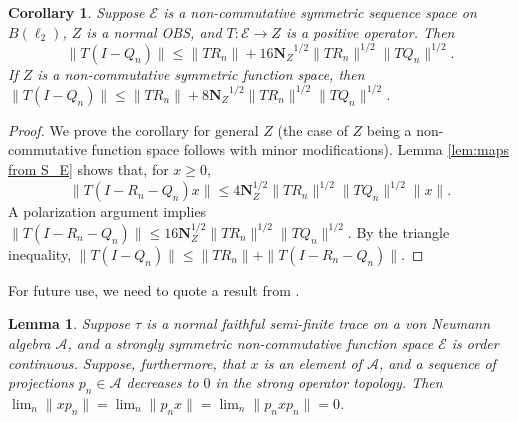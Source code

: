 \documentclass[12pt]{amsart}
\theoremstyle{plain}
\newtheorem{corollary}[theorem]{Corollary}
\newtheorem{lemma}[theorem]{Lemma}
\theoremstyle{definition}
\renewcommand{\leq}{\leqslant}
\renewcommand{\geq}{\geqslant}\usepackage{amssymb}
\newcommand{\ce}{\mathcal E}
\newcommand{\se}{{\mathcal S}_{\mathcal{E}}}
\newcommand{\A}{\mathcal{A}}
\newcommand{\nor}{\mathbf{N}}
\def \ran{{\mathrm{ran}} \, }
\begin{document}
\begin{corollary}\label{cor:maps from S_E}
Suppose $\ce$ is a non-commutative symmetric sequence space on $B(\ell_2)$,
$Z$ is a normal OBS, and $T : \ce \to Z$ is a positive operator. Then
$$
\|T (I - Q_n)\| \leq
 \|T R_n\| + 16 { \nor_Z}^{1/2} \|T R_n\|^{1/2} \|T Q_n\|^{1/2} .
$$
If $Z$ is a non-commutative symmetric function space, then
$\|T (I - Q_n)\| \leq \|T R_n\| + 8 { \nor_Z}^{1/2} \|T R_n\|^{1/2} \|T Q_n\|^{1/2}$.
\end{corollary}

\begin{proof}
We prove the corollary for general $Z$ (the case of $Z$ being a non-commutative function
space follows with minor modifications).
Lemma \ref{lem:maps from S_E} shows that, for $x \geq 0$,
$$\|T(I - R_n - Q_n) x\| \leq 4 \nor_Z^{1/2} \|T R_n\|^{1/2} \|T Q_n\|^{1/2} \|x\|.$$
A polarization argument implies
$\|T(I - R_n - Q_n)\| \leq 16 \nor_Z^{1/2} \|T R_n\|^{1/2} \|T Q_n\|^{1/2}$.
By the triangle inequality,
$\|T (I - Q_n)\| \leq \|T R_n\| + \|T(I - R_n - Q_n)\|$.
\end{proof}

For future use, we need to quote a result from \cite[Section 2]{CS}.

\begin{lemma}\label{lem:ord cont}
Suppose $\tau$ is a normal faithful semi-finite trace on a von Neumann
algebra $\A$, and a strongly symmetric non-commutative function space $\ce$
is order continuous.
Suppose, furthermore, that $x$ is an element of $\A$, and a sequence
of projections $p_n \in \A$ decreases to $0$ in the strong operator topology.
Then $\lim_n \|x p_n\| = \lim_n \|p_n x\| = \lim_n \|p_n x p_n\| = 0$.
\end{lemma}
\end{document}
